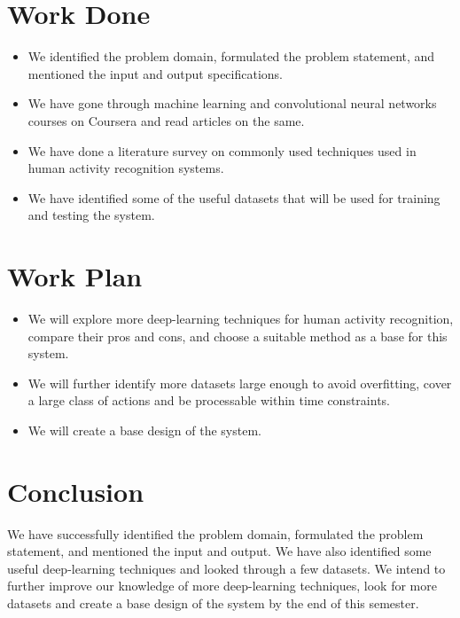 \documentclass[twocolumn]{article}
\begin{document}
\section{Work Done}
\begin{itemize}
\item We identified the problem domain, formulated the problem statement, and mentioned the input and output specifications.
\item We have gone through machine learning and convolutional neural networks courses on Coursera and read articles on the same.
\item We have done a literature survey on commonly used techniques used in human activity recognition systems.
\item We have identified some of the useful datasets that will be used for training and testing the system.
\end{itemize}

\section{Work Plan}
\begin{itemize}
\item We will explore more deep-learning techniques for human activity recognition, compare their pros and cons, and choose a suitable method as a base for this system.
\item We will further identify more datasets large enough to avoid overfitting, cover a large class of actions and be processable within time constraints.
\item We will create a base design of the system.
\end{itemize}

\section{Conclusion}
We have successfully identified the problem domain, formulated the problem statement, and mentioned the input and output. We have also identified some useful
deep-learning techniques and looked through a few datasets. We intend to further improve our knowledge of more deep-learning techniques, look for more datasets and
create a base design of the system by the end of this semester.

\end{document}
